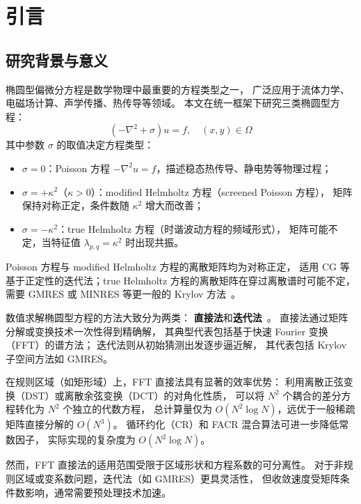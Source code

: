 \section{引言}

\subsection{研究背景与意义}

椭圆型偏微分方程是数学物理中最重要的方程类型之一，
广泛应用于流体力学、电磁场计算、声学传播、热传导等领域。
本文在统一框架下研究三类椭圆型方程：
\begin{equation}
  (-\nabla^2 + \sigma)u = f, \quad (x,y) \in \Omega
  \label{eq:unified_pde_intro}
\end{equation}
其中参数 $\sigma$ 的取值决定方程类型：
\begin{itemize}[itemsep=2pt]
  \item $\sigma = 0$：Poisson 方程 $-\nabla^2 u = f$，描述稳态热传导、静电势等物理过程；
  \item $\sigma = +\kappa^2$（$\kappa > 0$）：modified Helmholtz 方程（screened Poisson 方程），
        矩阵保持对称正定，条件数随 $\kappa^2$ 增大而改善；
  \item $\sigma = -\kappa^2$：true Helmholtz 方程（时谐波动方程的频域形式），
        矩阵可能不定，当特征值 $\lambda_{p,q}=\kappa^2$ 时出现共振。
\end{itemize}
Poisson 方程与 modified Helmholtz 方程的离散矩阵均为对称正定，
适用 CG 等基于正定性的迭代法；true Helmholtz 方程的离散矩阵在穿过离散谱时可能不定，
需要 GMRES 或 MINRES 等更一般的 Krylov 方法~\cite{ShaoWenting2017, LiuJiayuan2019, LiSiqing2020}。

数值求解椭圆型方程的方法大致分为两类：
\textbf{直接法}和\textbf{迭代法}~\cite{MinTao2017}。
直接法通过矩阵分解或变换技术一次性得到精确解，
其典型代表包括基于快速 Fourier 变换（FFT）的谱方法；
迭代法则从初始猜测出发逐步逼近解，
其代表包括 Krylov 子空间方法如 GMRES。

在规则区域（如矩形域）上，FFT 直接法具有显著的效率优势：
利用离散正弦变换（DST）或离散余弦变换（DCT）的对角化性质，
可以将 $N^2$ 个耦合的差分方程转化为 $N^2$ 个独立的代数方程，
总计算量仅为 $O(N^2 \log N)$，远优于一般稀疏矩阵直接分解的 $O(N^3)$。
循环约化（CR）和 FACR 混合算法可进一步降低常数因子，
实际实现的复杂度为 $O(N^2 \log N)$。

然而，FFT 直接法的适用范围受限于区域形状和方程系数的可分离性。
对于非规则区域或变系数问题，迭代法（如 GMRES）更具灵活性，
但收敛速度受矩阵条件数影响，通常需要预处理技术加速。

